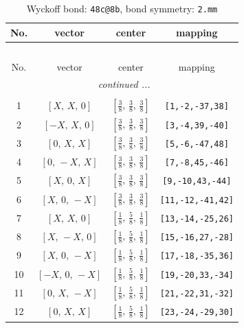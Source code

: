 \documentclass[fleqn,8pt]{jsarticle}
\begin{document}
\begin{longtable}{cccc}
\caption{Wyckoff bond: {\tt 48c@8b}, bond symmetry: {\tt 2.mm}}
 \\
 \hline \hline
No. & vector & center & mapping \\ \hline \endfirsthead

\multicolumn{3}{l}{\tablename\ \thetable{}} \\
 \hline \hline
No. & vector & center & mapping \\ \hline \endhead

 \hline \hline
\multicolumn{3}{r}{\footnotesize\it continued ...} \\ \endfoot

 \hline \hline
\multicolumn{3}{r}{} \\ \endlastfoot

1 & $\left[ X,\, X,\, 0 \right]$ & $\left[ \frac{3}{8},\, \frac{3}{8},\, \frac{3}{8} \right]$ & {\tt [1,-2,-37,38]} \\ \hline
2 & $\left[ - X,\, X,\, 0 \right]$ & $\left[ \frac{3}{8},\, \frac{3}{8},\, \frac{3}{8} \right]$ & {\tt [3,-4,39,-40]} \\ \hline
3 & $\left[ 0,\, X,\, X \right]$ & $\left[ \frac{3}{8},\, \frac{3}{8},\, \frac{3}{8} \right]$ & {\tt [5,-6,-47,48]} \\ \hline
4 & $\left[ 0,\, - X,\, X \right]$ & $\left[ \frac{3}{8},\, \frac{3}{8},\, \frac{3}{8} \right]$ & {\tt [7,-8,45,-46]} \\ \hline
5 & $\left[ X,\, 0,\, X \right]$ & $\left[ \frac{3}{8},\, \frac{3}{8},\, \frac{3}{8} \right]$ & {\tt [9,-10,43,-44]} \\ \hline
6 & $\left[ X,\, 0,\, - X \right]$ & $\left[ \frac{3}{8},\, \frac{3}{8},\, \frac{3}{8} \right]$ & {\tt [11,-12,-41,42]} \\ \hline
7 & $\left[ X,\, X,\, 0 \right]$ & $\left[ \frac{1}{8},\, \frac{5}{8},\, \frac{1}{8} \right]$ & {\tt [13,-14,-25,26]} \\ \hline
8 & $\left[ X,\, - X,\, 0 \right]$ & $\left[ \frac{1}{8},\, \frac{5}{8},\, \frac{1}{8} \right]$ & {\tt [15,-16,27,-28]} \\ \hline
9 & $\left[ X,\, 0,\, - X \right]$ & $\left[ \frac{1}{8},\, \frac{5}{8},\, \frac{1}{8} \right]$ & {\tt [17,-18,-35,36]} \\ \hline
10 & $\left[ - X,\, 0,\, - X \right]$ & $\left[ \frac{1}{8},\, \frac{5}{8},\, \frac{1}{8} \right]$ & {\tt [19,-20,33,-34]} \\ \hline
11 & $\left[ 0,\, X,\, - X \right]$ & $\left[ \frac{1}{8},\, \frac{5}{8},\, \frac{1}{8} \right]$ & {\tt [21,-22,31,-32]} \\ \hline
12 & $\left[ 0,\, X,\, X \right]$ & $\left[ \frac{1}{8},\, \frac{5}{8},\, \frac{1}{8} \right]$ & {\tt [23,-24,-29,30]} \\
\end{longtable}
\end{document}
